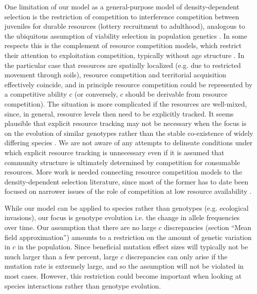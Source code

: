 \documentclass[11pt]{article}
\begin{document}
One limitation of our model as a general-purpose model of density-dependent selection is the restriction of competition to interference competition between juveniles for durable resources (lottery recruitment to adulthood), analogous to the ubiquitous assumption of viability selection in population genetics \citep[p. 45]{ewens_2004}. In some respects this is the complement of resource competition models, which restrict their attention to exploitation competition, typically without age structure \citep{tilman_1982}. In the particular case that resources are spatially localized (e.g. due to restricted movement through soils), resource competition and territorial acquisition effectively coincide, and in principle resource competition could be represented by a competitive ability $c$ (or conversely, $c$ should be derivable from resource competition). The situation is more complicated if the resources are well-mixed, since, in general, resource levels then need to be explicitly tracked. It seems plausible that explicit resource tracking may not be necessary when the focus is on the evolution of similar genotypes rather than the stable co-existence of widely differing species \citep{ram_2016}. We are not aware of any attempts to delineate conditions under which explicit resource tracking is unnecessary even if it is assumed that community structure is ultimately determined by competition for consumable resources. More work is needed connecting resource competition models to the density-dependent selection literature, since most of the former has to date been focused on narrower issues of the role of competition at low resource availability \citep{aerts_1999,davis_1998,tilman_2007}.  

While our model can be applied to species rather than genotypes (e.g. ecological invasions), our focus is genotype evolution i.e. the change in allele frequencies over time. Our assumption that there are no large $c$ discrepancies (section ``Mean field approximation'') amounts to a restriction on the amount of genetic variation in $c$ in the population. Since beneficial mutation effect sizes will typically not be much larger than a few percent, large $c$ discrepancies can only arise if the mutation rate is extremely large, and so the assumption will not be violated in most cases. However, this restriction could become important when looking at species interactions rather than genotype evolution.

\end{document}
